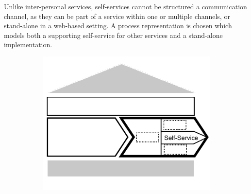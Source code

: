	Unlike inter-personal services, self-services cannot be structured \wrt a communication channel, as they can be part of a service within one or multiple channels, or stand-alone in a web-based setting. A process representation is chosen which models both a supporting self-service for other services and a stand-alone implementation.
	
	\begin{figure}[caption={Self-Service process}, label={fig:selfservice}]
		\begin{subfigure}[b]{.45\textwidth}
			\begin{center}
				\includegraphics{figures/processes/selfservice.pdf}
			\end{center}
		\end{subfigure}
		\begin{subfigure}[b]{.45\textwidth}
			\begin{center}
			\end{center}
		\end{subfigure}
		
	\end{figure}
	
